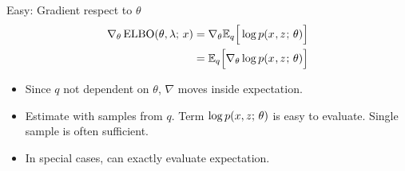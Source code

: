 \begin{frame}
Easy: Gradient respect to $\theta$
\begin{align*}
\nabla_{\theta} \operatorname*{ELBO}(\theta, \lambda ; \, x) &=  \nabla_\theta \mathbb{E}_{ q}\Big[ \log p(x^{}, z^{} ; \, \theta) \Big] \\
&= \mathbb{E}_{q}\Big[\nabla_{\theta} \log p(x^{}, z^{} ; \, \theta) \Big] 
\end{align*}
\begin{itemize}
    \item Since $q$ not dependent on $\theta$, $\nabla$ moves inside expectation.
    \item Estimate with samples from $q$. Term $\log p(x, z ; \, \theta)$ is easy to evaluate. Single sample is often sufficient. 
    \item In special cases, can exactly evaluate expectation.
\end{itemize}
\end{frame}




